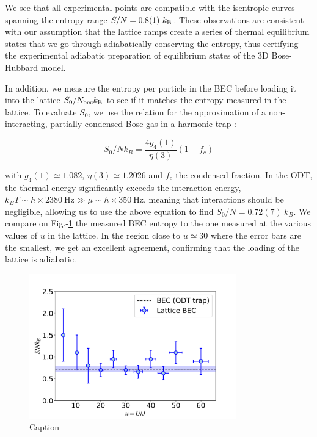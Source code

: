 
\noindent We see that all experimental points are compatible with the isentropic curves spanning the entropy range $S/N= 0.8(1) \ k_{\mathrm{B}}$. These observations are consistent with our assumption that the lattice ramps create a series of thermal equilibrium states that we go through adiabatically conserving the entropy, thus certifying the experimental adiabatic preparation of equilibrium states of the 3D Bose-Hubbard model.

In addition, we measure the entropy per particle in the BEC before loading it into the lattice $S_0/N_{\rm{bec}} k_{\mathrm{B}}$ to see if it matches the entropy measured in the lattice. To evaluate $S_0$, we use the relation for the approximation of a non-interacting, partially-condensed Bose gas in a harmonic trap \cite{pitaevskii2016bose}:

\begin{equation}
    S_{0} / N k_{B}=\frac{4 g_{4}(1)}{\eta(3)}\left(1-f_{c}\right)
\end{equation}

\noindent with $g_{4}(1) \simeq 1.082$, $\eta(3) \simeq 1.2026$ and $f_c$ the condensed fraction.
 In the ODT, the thermal energy significantly exceeds the interaction energy, $k_{B} T \sim h \times 2380 \mathrm{~Hz} \gg \mu \sim h \times 350 \mathrm{~Hz}$, meaning that interactions should be negligible, allowing us to use the above equation to find $S_{0} / N= 0.72(7) \ k_{B}$. We compare on Fig.-\ref{fig:entropy_BEC} the measured BEC entropy to the one measured at the various values of $u$ in the lattice. In the region close to $u \simeq 30$ where the error bars are the smallest, we get an excellent agreement, confirming that the loading of the lattice is adiabatic.

\begin{figure}
    \centering
    \includegraphics[width=0.8\textwidth]{Fig/Chapter3/entropy_BEC.pdf}
    \caption{Caption}
    \label{fig:entropy_BEC}
\end{figure}

